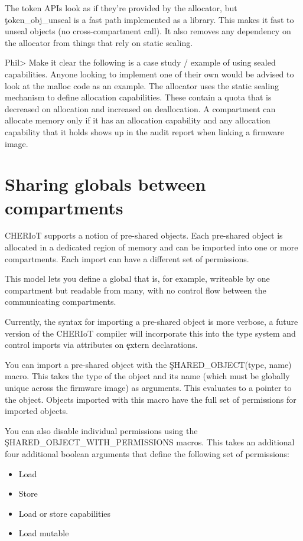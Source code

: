 The token APIs look as if they're provided by the allocator, but \c{token_obj_unseal} is a fast path implemented as a library.
This makes it fast to unseal objects (no cross-compartment call).
It also removes any dependency on the allocator from things that rely on static sealing.

Phil> Make it clear the following is a case study / example of using sealed capabilities. Anyone looking to implement one of their own would be advised to look at the malloc code as an example. 
The allocator uses the static sealing mechanism to define allocation capabilities.
These contain a quota that is decreased on allocation and increased on deallocation.
A compartment can allocate memory only if it has an allocation capability and any allocation capability that it holds shows up in the audit report when linking a firmware image.

\section{Sharing globals between compartments}

CHERIoT supports a notion of pre-shared objects.
Each pre-shared object is allocated in a dedicated region of memory and can be imported into one or more compartments.
Each import can have a different set of permissions.

This model lets you define a global that is, for example, writeable by one compartment but readable from many, with no control flow between the communicating compartments.

Currently, the syntax for importing a pre-shared object is more verbose, a future version of the CHERIoT compiler will incorporate this into the type system and control imports via attributes on \c{extern} declarations.

You can import a pre-shared object with the \c{SHARED_OBJECT(type, name)} macro.
This takes the type of the object and its name (which must be globally unique across the firmware image) as arguments.
This evaluates to a pointer to the object.
Objects imported with this macro have the full set of permissions for imported objects.

You can also disable individual permissions using the \c{SHARED_OBJECT_WITH_PERMISSIONS} macros.
This takes an additional four additional boolean arguments that define the following set of permissions:

\begin{itemize}
	\item{Load}
	\item{Store}
	\item{Load or store capabilities}
	\item{Load mutable}
\end{itemize}


